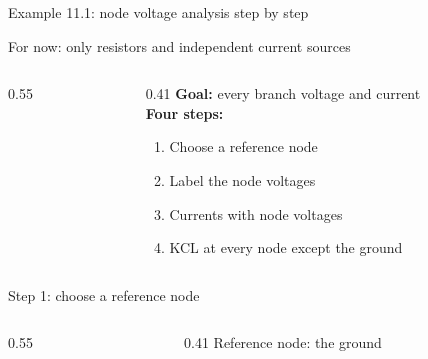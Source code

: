 \documentclass[11pt,aspectratio=169]{beamer}
\newcommand{\Icol}[1]{\textcolor{ccur}{#1}}
\newcommand{\Vcol}[1]{\textcolor{cvolt}{#1}}
\newcommand{\nodev}[3]{\fill (#1) circle (1.7pt) node[#2, inner sep=2pt, font=\small, text=cvolt] {#3};}
\newcommand{\gnd}[1]{\draw (#1,0) -- (#1,-0.2) node[ground] {};}
\newcommand{\nodeA}[3]{\ifnum\exAst>1 \nodev{#1}{#2}{#3}\else\fill (#1) circle (1.7pt);\fi}
\newcommand{\exA}[1]{%
  \ifnum#1=0
    \draw (0,0) to[american current source, l=$\Icol{i_{s1}}$] (0,2);
  \else
    \draw (0,0) to[american current source, l=$\Icol{i_s}$] (0,2);
  \fi
  \draw (0,2) -- (1.8,2) to[R, l=$R_2$] (3.8,2) to[R, l_=$R_4$] (5.8,2);
  \draw (1.8,2) to[R, l_=$R_1$] (1.8,0);
  \draw (3.8,2) to[R, l_=$R_3$] (3.8,0);
  \draw (0,0) -- (5.8,0);
  \ifnum#1=0
    \draw (1.8,2) -- (1.8,3.0) to[R, l=$R_5$] (5.8,3.0) -- (5.8,2);
    \draw (5.8,2) to[american current source, l=$\Icol{i_{s2}}$] (5.8,0);
    \nodeA{3.8,2}{above}{$e_2$}
    \nodeA{5.8,2}{above right}{$e_3$}
    \nodeA{1.8,2}{above left}{$e_1$}
  \else
    \draw (5.8,0) to[american voltage source, invert, l_=$\Vcol{v_s}$] (5.8,2);
    \nodev{3.8,2}{above}{$e_2$}
    \ifnum#1=1 \nodev{5.8,2}{above}{$e_3$}\else \fill (5.8,2) circle (1.7pt);\fi
  \fi
  \ifnum#1=0\else\nodeA{1.8,2}{above}{$e_1$}\fi
  \ifnum\exAst>0 \gnd{3.8}\fi}
\begin{document}
\begin{frame}{Example 11.1: node voltage analysis step by step}
  \begin{center}
    {\small For now: only \alert{resistors} and \alert{independent current sources}}
  \end{center}
  \begin{columns}[c,onlytextwidth]
    \begin{column}{0.55\textwidth}
      \centering
    \end{column}
    \begin{column}{0.41\textwidth}
      \textbf{Goal:} every branch voltage and current\\[12pt]
      \textbf{Four steps:}
      \begin{enumerate}\itemsep4pt
        \item Choose a reference node
        \item Label the node voltages
        \item Currents with node voltages
        \item KCL at every node except the ground
      \end{enumerate}
    \end{column}
  \end{columns}
\end{frame}

\begin{frame}{Step 1: choose a reference node}
  \begin{columns}[c,onlytextwidth]
    \begin{column}{0.55\textwidth}
      \centering
    \end{column}
    \begin{column}{0.41\textwidth}
      \alert{Reference node}: the ground\\[12pt]
    \end{column}
  \end{columns}
\end{frame}
\end{document}
